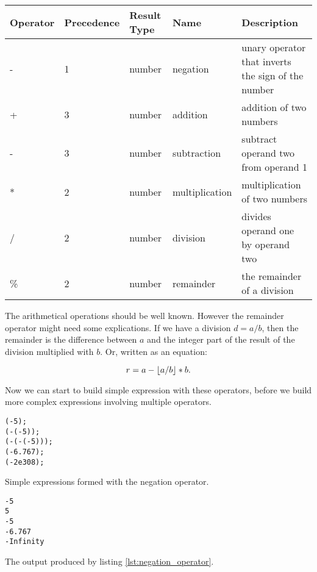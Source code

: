 \begin{center}
\begin{tabular}{|l|l|l|l|p{3cm}|}
\hline
Operator & Precedence & Result Type & Name & Description \\ \hline
- & 1 & number & negation & unary operator that inverts the sign of the number \\ \hline
+ & 3 & number & addition & addition of two numbers \\ \hline
- & 3 & number & subtraction & subtract operand two from operand 1 \\ \hline
* & 2 & number & multiplication & multiplication of two numbers \\ \hline
/ & 2 & number & division & divides operand one by operand two \\ \hline
\% & 2 & number & remainder & the remainder of a division
\\
\hline
\end{tabular}
\label{tbl:number_operations}
\end{center}

The arithmetical operations should be well known. However the remainder operator might need some explications. If we have a division $d = a / b$, then the remainder is the difference between $a$ and the integer part of the result of the division multiplied with $b$. Or, written as an equation: 

 \begin{equation}\label{eq:remainder}
    r = a-\floor*{a / b} * b.
  \end{equation}

Now we can start to build simple expression with these operators, before we build more complex expressions involving multiple operators.

\begin{listing}[H]
\begin{verbatim}
(-5);	
(-(-5));	
(-(-(-5)));
(-6.767);
(-2e308);
\end{verbatim}
\caption{Simple expressions formed with the negation operator.}
\label{lst:negation_operator}
\end{listing}

\begin{listing}[H]
\begin{verbatim}
-5
5
-5
-6.767
-Infinity
\end{verbatim}
\caption{The output produced by listing \ref{lst:negation_operator}.}
\label{lst:output_negation_operator}
\end{listing}

